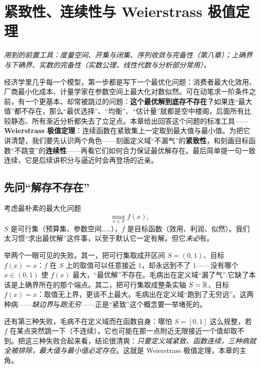 \chapter{紧致性、连续性与 Weierstrass 极值定理}
\label{ch:compact}

\noindent\emph{用到的前置工具：度量空间、开集与闭集、序列收敛与完备性（第八章）；上确界与下确界、实数的完备性（实数公理，线性代数与分析部分常用）。}
\medskip

经济学里几乎每一个模型，第一步都是写下一个最优化问题：消费者最大化效用、厂商最小化成本、计量学家在参数空间上最大化对数似然。可在动笔求一阶条件之前，有一个更基本、却常被跳过的问题：\textbf{这个最优解到底存不存在？}如果连``最大值''都不存在，那么``最优选择''、``均衡''、``估计量''就都是空中楼阁，后面所有比较静态、所有渐近分析都失去了立足点。本章给出回答这个问题的标准工具——\textbf{Weierstrass 极值定理}：连续函数在紧致集上一定取到最大值与最小值。为把它讲清楚，我们要先认识两个角色——刻画定义域``不漏气''的\textbf{紧致性}，和刻画目标函数``不跳变''的\textbf{连续性}——再看它们如何合力保证最优解存在。最后简单提一句一致连续，它是后续讲积分与逼近时会再登场的近亲。

\section{先问``解存不存在''}
\label{sec:compact-motivation}

考虑最朴素的最大化问题
\[
    \max_{x\in S} f(x),
\]
$S$ 是可行集（预算集、参数空间……），$f$ 是目标函数（效用、利润、似然）。我们太习惯``求出最优解''这件事，以至于默认它一定有解。但它\emph{未必}有。

举两个一眼可见的失败。其一，把可行集取成开区间 $S=(0,1)$、目标 $f(x)=x$：$f$ 在 $S$ 上的取值可以任意接近 $1$，却永远到不了 $1$——没有哪个 $x\in(0,1)$ 使 $f(x)$ 最大，``最优解''不存在。毛病出在定义域``漏了气'':它缺了本该是上确界所在的那个端点。其二，把可行集取成整条实轴 $S=\mathbb{R}$、目标 $f(x)=x$：取值无上界，更谈不上最大。毛病出在定义域``跑到了无穷远''。这两种病——\emph{缺边界}与\emph{跑无穷}——正是``紧致''这个概念要一举堵死的。

还有第三种失败，毛病不在定义域而在函数自身：哪怕 $S=[0,1]$ 这么规整，若 $f$ 在某点突然跳一下（不连续），它也可能在那一点附近无限接近一个值却取不到。把这三种失败合起来看，结论很清爽：\emph{只要定义域紧致、函数连续，三种病就全被排除，最大值与最小值必定存在}。这就是 Weierstrass 极值定理，本章的主角。


